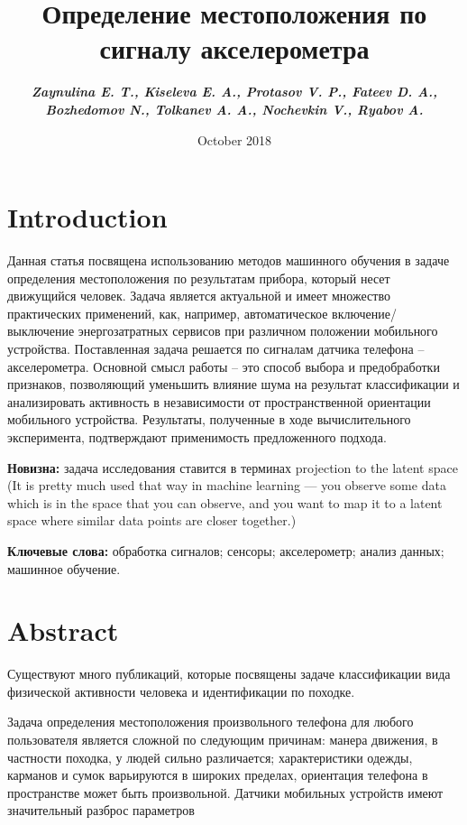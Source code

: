 \documentclass{article}
\title{Определение местоположения по сигналу акселерометра}
\author{\bf \em Zaynulina E. T., Kiseleva E. A., Protasov V. P., Fateev D. A.,\\
 \bf \em Bozhedomov N., Tolkanev A. A., Nochevkin V., Ryabov A. }
\date{October 2018}
\begin{document}
\maketitle

\section{Introduction}
Данная статья посвящена использованию методов машинного обучения в задаче определения
местоположения по результатам прибора, который несет движущийся
человек. Задача является актуальной и имеет множество практических применений, как,
например, автоматическое включение/выключение энергозатратных сервисов при различном
положении мобильного устройства. Поставленная задача решается по сигналам датчика телефона – акселерометра. Основной смысл работы – это способ
выбора и предобработки признаков, позволяющий уменьшить влияние шума на результат
классификации и анализировать активность в независимости от пространственной
ориентации мобильного устройства. Результаты, полученные в ходе вычислительного эксперимента,
подтверждают применимость предложенного подхода.


{\bf Новизна:} задача исследования ставится в терминах projection to the latent space (It is pretty much used that way in machine learning — you observe some data which is in the space that you can observe, and you want to map it to a latent space where similar data points are closer together.)



{\bf Ключевые слова:} обработка сигналов; сенсоры; акселерометр; анализ данных; машинное
обучение.
\section{Abstract}
Существуют много публикаций, которые посвящены задаче классификации вида физической
активности человека и идентификации по походке.

Задача определения местоположения произвольного телефона для любого пользователя
является сложной по следующим причинам: манера движения, в частности походка,
у людей сильно различается; характеристики одежды, карманов и сумок варьируются
в широких пределах, ориентация телефона в пространстве может быть произвольной.
Датчики мобильных устройств имеют значительный разброс параметров
\end{document}
